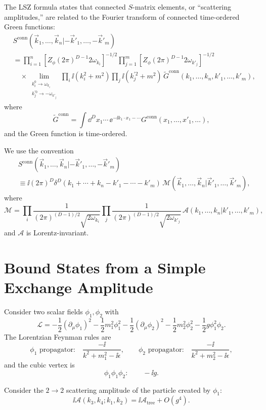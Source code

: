 The LSZ formula states that connected \(S\)-matrix elements, or
``scattering amplitudes,'' are related to the Fourier transform of
connected time-ordered Green functions:
\[
\begin{aligned}
  &S^{\mathrm{conn}}(\vec k_1,\ldots,\vec k_n
  |-\vec k'_1,\ldots,-\vec k'_m)
\\
  &=
  \prod_{i=1}^{n}
  \left[Z_\phi(2\pi)^{D-1}2\omega_{k_i}\right]^{-1/2}
  \prod_{j=1}^{m}
  \left[Z_\phi(2\pi)^{D-1}2\omega_{k'_j}\right]^{-1/2}
\\
  &\quad\times
  \lim_{\substack{k_i^0\to\omega_{k_i}\\ k_j^{\prime 0}\to-\omega_{k'_j}}}
  \prod_i \ii(k_i^2+m^2)
  \prod_j \ii(k_j^{\prime 2}+m^2)\,
  \widetilde G^{\mathrm{conn}}(k_1,\ldots,k_n,k'_1,\ldots,k'_m),
\end{aligned}
\]
where
\[
  \widetilde G^{\mathrm{conn}}
  =
  \int \dd^D x_1\cdots\,
  \ee^{-\ii k_1\cdot x_1-\cdots}
  G^{\mathrm{conn}}(x_1,\ldots,x'_1,\ldots),
\]
and the Green function is time-ordered.

We use the convention
\[
\begin{aligned}
  &S^{\mathrm{conn}}(\vec k_1,\ldots,\vec k_n
  |-\vec k'_1,\ldots,-\vec k'_m)
\\
  &\equiv
  \ii(2\pi)^D
  \delta^D(k_1+\cdots+k_n-k'_1-\cdots-k'_m)\,
  \mathcal M(\vec k_1,\ldots,\vec k_n|\vec k'_1,\ldots,\vec k'_m),
\end{aligned}
\]
where
\[
  \mathcal M
  =
  \prod_i\frac{1}{(2\pi)^{(D-1)/2}\sqrt{2\omega_{k_i}}}
  \prod_j\frac{1}{(2\pi)^{(D-1)/2}\sqrt{2\omega_{k'_j}}}\,
  \mathcal A(k_1,\ldots,k_n|k'_1,\ldots,k'_m),
\]
and \(\mathcal A\) is Lorentz-invariant.

\section{Bound States from a Simple Exchange Amplitude}

Consider two scalar fields \(\phi_1,\phi_2\) with
\[
  \mathcal L
  =
  -\frac12(\partial_\mu\phi_1)^2-\frac12 m_1^2\phi_1^2
  -\frac12(\partial_\mu\phi_2)^2-\frac12 m_2^2\phi_2^2
  -\frac12 g\phi_1^2\phi_2.
\]
The Lorentzian Feynman rules are
\[
  \phi_1\text{ propagator:}\quad
  \frac{-\ii}{k^2+m_1^2-\ii\epsilon},
  \qquad
  \phi_2\text{ propagator:}\quad
  \frac{-\ii}{k^2+m_2^2-\ii\epsilon},
\]
and the cubic vertex is
\[
  \phi_1\phi_1\phi_2:\qquad -\ii g.
\]

Consider the \(2\to2\) scattering amplitude of the particle created by
\(\phi_1\):
\[
  \ii\mathcal A(k_3,k_4;k_1,k_2)
  =
  \ii\mathcal A_{\mathrm{tree}}+O(g^4).
\]

